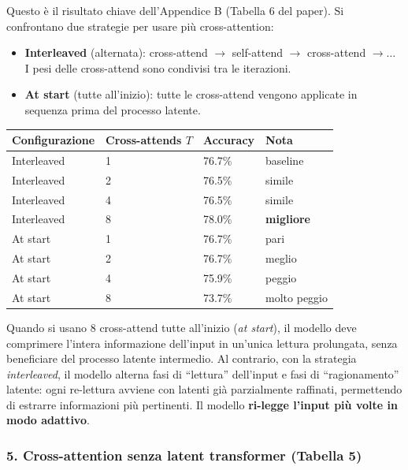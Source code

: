 \documentclass[
  11pt,
]{article}
\begin{document}
Questo è il risultato chiave dell'Appendice B (Tabella 6 del paper). Si confrontano due strategie per usare più cross-attention:

\begin{itemize}
  \item \textbf{Interleaved} (alternata): cross-attend $\to$ self-attend $\to$ cross-attend $\to \ldots$ I pesi delle cross-attend sono condivisi tra le iterazioni.
  \item \textbf{At start} (tutte all'inizio): tutte le cross-attend vengono applicate in sequenza prima del processo latente.
\end{itemize}

{\small
\begin{longtable}{@{}p{4.5cm} p{3.5cm} p{2.5cm} p{1.5cm}@{}}
\toprule
\textbf{Configurazione} & \textbf{Cross-attends $T$} & \textbf{Accuracy} & \textbf{Nota} \\
\midrule
\endhead
Interleaved & 1  & 76.7\% & baseline \\[2pt]
Interleaved & 2  & 76.5\% & simile \\[2pt]
Interleaved & 4  & 76.5\% & simile \\[2pt]
Interleaved & 8  & 78.0\% & \textbf{migliore} \\[2pt]
At start    & 1  & 76.7\% & pari \\[2pt]
At start    & 2  & 76.7\% & meglio \\[2pt]
At start    & 4  & 75.9\% & peggio \\[2pt]
At start    & 8  & 73.7\% & molto peggio \\[2pt]
\bottomrule
\end{longtable}
}

\begin{notabox}[title={\textbf{Interpretazione: perché interleaved batte ``at start''}}]
Quando si usano 8 cross-attend tutte all'inizio (\emph{at start}), il modello deve comprimere l'intera informazione dell'input in un'unica lettura prolungata, senza beneficiare del processo latente intermedio. Al contrario, con la strategia \emph{interleaved}, il modello alterna fasi di ``lettura'' dell'input e fasi di ``ragionamento'' latente: ogni re-lettura avviene con latenti già parzialmente raffinati, permettendo di estrarre informazioni più pertinenti. Il modello \textbf{ri-legge l'input più volte in modo adattivo}.
\end{notabox}

\subsubsection*{5. Cross-attention senza latent transformer (Tabella 5)}
\end{document}

